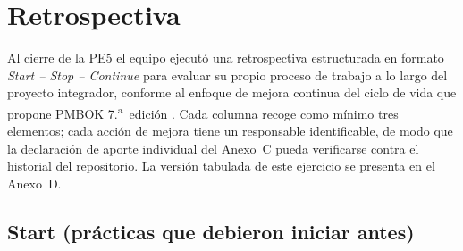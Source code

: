 \section{Retrospectiva}
\label{sec:retrospectiva}

Al cierre de la PE5 el equipo ejecut\'o una retrospectiva estructurada en formato \emph{Start -- Stop -- Continue} para evaluar su propio proceso de trabajo a lo largo del proyecto integrador, conforme al enfoque de mejora continua del ciclo de vida que propone PMBOK 7.\textsuperscript{a}~edici\'on \cite{pmbok7}. Cada columna recoge como m\'inimo tres elementos; cada acci\'on de mejora tiene un responsable identificable, de modo que la declaraci\'on de aporte individual del Anexo~C pueda verificarse contra el historial del repositorio. La versi\'on tabulada de este ejercicio se presenta en el Anexo~D.

\subsection{Start (pr\'acticas que debieron iniciar antes)}

